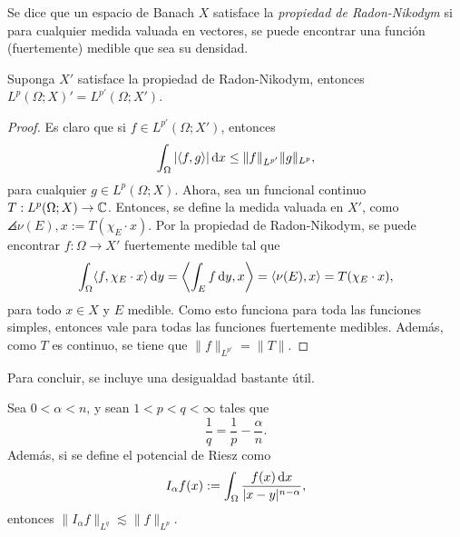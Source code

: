 \begin{definition}
	Se dice que un espacio de Banach $X$ satisface la \textit{propiedad de Radon-Nikodym} si para cualquier medida valuada en vectores, se puede encontrar una función (fuertemente) medible que sea su densidad.
\end{definition}
\begin{theorem}
	Suponga $X'$ satisface la propiedad de Radon-Nikodym, entonces $L^p(\Omega; X)' = L^{p'}(\Omega;X')$.
\end{theorem}
\begin{proof}
	Es claro que si $f\in L^{p'}(\Omega;X')$, entonces 
	\begin{equation*}
		\int_\Omega |\langle f, g\rangle|\mathop{}\!\mathrm{d} x \leq \|f\|_{L^{p'}}\|g\|_{L^p},
	\end{equation*}
	para cualquier $g\in L^p(\Omega;X)$. Ahora, sea un funcional continuo $T:L^p(\Omega; X)\to\mathbb{C}$. Entonces, se define la medida valuada en $X'$, como $\angles{\nu(E), x} := T(\chi_E\cdot x)$. Por la propiedad de Radon-Nikodym, se puede encontrar $f:\Omega\to X'$ fuertemente medible tal que 
	\begin{equation*}
		\int_\Omega \langle f, \chi_E\cdot x\rangle \mathop{}\!\mathrm{d} y = \left\langle\int_E f\mathop{}\!\mathrm{d} y, x\right\rangle = \langle\nu(E), x\rangle = T(\chi_E \cdot x),
	\end{equation*}
	para todo $x\in X$ y $E$ medible. Como esto funciona para toda las funciones simples, entonces vale para todas las funciones fuertemente medibles. Además, como $T$ es continuo, se tiene que $\|f\|_{L^{p'}} = \|T\|$.
\end{proof}
Para concluir, se incluye una desigualdad bastante útil.
\begin{theorem}
	Sea $0<\alpha<n$, y sean $1<p<q<\infty$ tales que 
	\begin{equation*}
		\frac{1}{q} = \frac{1}{p} - \frac{\alpha}{n}.
	\end{equation*}
	Además, si se define el potencial de Riesz como 
	\begin{equation*}
		I_\alpha f(x) := \int_{\Omega} \frac{f(x)\mathop{}\!\mathrm{d} x}{|x-y|^{n-\alpha}},
	\end{equation*}
	entonces $\|I_\alpha f\|_{L^q} \lesssim \|f\|_{L^p}$.
\end{theorem}
